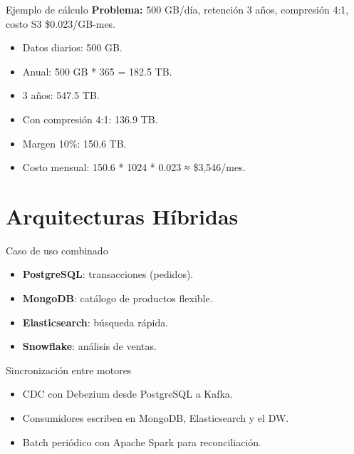 \documentclass[aspectratio=169, 10pt, xcolor=table]{beamer}
\begin{document}
\begin{frame}{Ejemplo de cálculo}
    \textbf{Problema:} 500 GB/día, retención 3 años, compresión 4:1, costo S3 \$0.023/GB-mes.

    \begin{itemize}
        \item Datos diarios: 500 GB.
        \item Anual: 500 GB * 365 = 182.5 TB.
        \item 3 años: 547.5 TB.
        \item Con compresión 4:1: 136.9 TB.
        \item Margen 10\%: 150.6 TB.
        \item Costo mensual: 150.6 * 1024 * 0.023 ≈ \$3,546/mes.
    \end{itemize}
\end{frame}

\section{Arquitecturas Híbridas}

\begin{frame}{Caso de uso combinado}
    \begin{itemize}
        \item \textbf{PostgreSQL}: transacciones (pedidos).
        \item \textbf{MongoDB}: catálogo de productos flexible.
        \item \textbf{Elasticsearch}: búsqueda rápida.
        \item \textbf{Snowflake}: análisis de ventas.
    \end{itemize}
\end{frame}

\begin{frame}{Sincronización entre motores}
    \begin{itemize}
        \item CDC con Debezium desde PostgreSQL a Kafka.
        \item Consumidores escriben en MongoDB, Elasticsearch y el DW.
        \item Batch periódico con Apache Spark para reconciliación.
    \end{itemize}
\end{frame}
\end{document}
